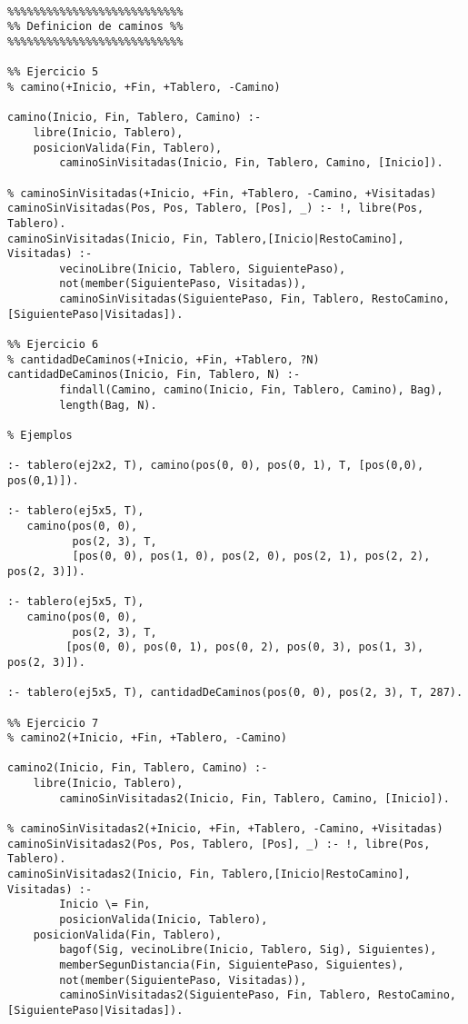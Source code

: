 \begin{verbatim}

%%%%%%%%%%%%%%%%%%%%%%%%%%%
%% Definicion de caminos %%
%%%%%%%%%%%%%%%%%%%%%%%%%%%

%% Ejercicio 5
% camino(+Inicio, +Fin, +Tablero, -Camino)

camino(Inicio, Fin, Tablero, Camino) :-
    libre(Inicio, Tablero),
    posicionValida(Fin, Tablero),
        caminoSinVisitadas(Inicio, Fin, Tablero, Camino, [Inicio]).

% caminoSinVisitadas(+Inicio, +Fin, +Tablero, -Camino, +Visitadas)
caminoSinVisitadas(Pos, Pos, Tablero, [Pos], _) :- !, libre(Pos, Tablero).
caminoSinVisitadas(Inicio, Fin, Tablero,[Inicio|RestoCamino], Visitadas) :-
        vecinoLibre(Inicio, Tablero, SiguientePaso),
        not(member(SiguientePaso, Visitadas)),
        caminoSinVisitadas(SiguientePaso, Fin, Tablero, RestoCamino, [SiguientePaso|Visitadas]).

%% Ejercicio 6
% cantidadDeCaminos(+Inicio, +Fin, +Tablero, ?N)
cantidadDeCaminos(Inicio, Fin, Tablero, N) :- 
        findall(Camino, camino(Inicio, Fin, Tablero, Camino), Bag),
        length(Bag, N).

% Ejemplos

:- tablero(ej2x2, T), camino(pos(0, 0), pos(0, 1), T, [pos(0,0), pos(0,1)]).

:- tablero(ej5x5, T), 
   camino(pos(0, 0),
          pos(2, 3), T, 
          [pos(0, 0), pos(1, 0), pos(2, 0), pos(2, 1), pos(2, 2), pos(2, 3)]).

:- tablero(ej5x5, T), 
   camino(pos(0, 0), 
          pos(2, 3), T, 
         [pos(0, 0), pos(0, 1), pos(0, 2), pos(0, 3), pos(1, 3), pos(2, 3)]).

:- tablero(ej5x5, T), cantidadDeCaminos(pos(0, 0), pos(2, 3), T, 287).

%% Ejercicio 7
% camino2(+Inicio, +Fin, +Tablero, -Camino)

camino2(Inicio, Fin, Tablero, Camino) :-
    libre(Inicio, Tablero),
        caminoSinVisitadas2(Inicio, Fin, Tablero, Camino, [Inicio]).

% caminoSinVisitadas2(+Inicio, +Fin, +Tablero, -Camino, +Visitadas)
caminoSinVisitadas2(Pos, Pos, Tablero, [Pos], _) :- !, libre(Pos, Tablero).
caminoSinVisitadas2(Inicio, Fin, Tablero,[Inicio|RestoCamino], Visitadas) :-
        Inicio \= Fin,
        posicionValida(Inicio, Tablero),
    posicionValida(Fin, Tablero),
        bagof(Sig, vecinoLibre(Inicio, Tablero, Sig), Siguientes),
        memberSegunDistancia(Fin, SiguientePaso, Siguientes),
        not(member(SiguientePaso, Visitadas)),
        caminoSinVisitadas2(SiguientePaso, Fin, Tablero, RestoCamino, [SiguientePaso|Visitadas]).


\end{verbatim}
